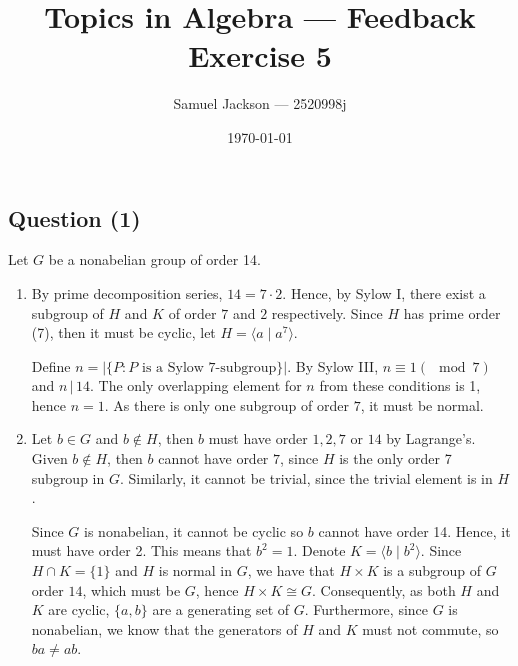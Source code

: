 \documentclass{article}
\title{Topics in Algebra  --- Feedback Exercise 5}
\author{Samuel Jackson --- 2520998j}
\date{\today}
\begin{document}
\newcommand{\order}[1]{|#1|}
\newcommand{\setS}{\mathcal{S}}
\newcommand{\norm}{\trianglelefteq}

\newcommand{\Z}{\mathbb{Z}}

\maketitle

\begin{center}
\section*{Question (1)}
\end{center}

Let $G$ be a nonabelian group of order 14.
\begin{enumerate}[label=\alph*)]
	\item By prime decomposition series, $14 = 7 \cdot 2$. Hence, by Sylow I, there exist a subgroup of $H$ and $K$ of order $7$ and $2$ respectively. Since $H$ has prime order (7), then it must be cyclic, let $H = \langle a \mid a^7\rangle$. 
	
	Define $n = |\{P : P\text{ is a Sylow 7-subgroup}\}|$. By Sylow III, $n \equiv 1 (\mod 7)$ and $n \,|\,14$. The only overlapping element for $n$ from these conditions is 1, hence $n = 1$. As there is only one subgroup of order $7$, it must be normal.
	
	\item Let $b \in G$ and $b \notin H$, then $b$ must have order $1, 2, 7 \text{ or } 14$ by Lagrange's. Given $b \notin H$, then $b$ cannot have order $7$, since $H$ is the only order 7 subgroup in $G$. Similarly, it cannot be trivial, since the trivial element is in $H$.  
	
	Since $G$ is nonabelian, it cannot be cyclic so $b$ cannot have order 14. Hence, it must have order 2. This means that $b^2 = 1$. Denote $K = \langle b \mid b^2 \rangle$. Since $H \cap K = \{1\}$ and $H$ is normal in $G$, we have that $H \times K$ is a subgroup of $G$ order $14$, which must be $G$, hence $H \times K \cong G$. Consequently, as both $H$ and $K$ are cyclic, $\{a, b\}$ are a generating set of $G$. Furthermore, since $G$ is nonabelian, we know that the generators of $H$ and $K$ must not commute, so $ba \neq ab$.
	

\end{enumerate}
\end{document}
